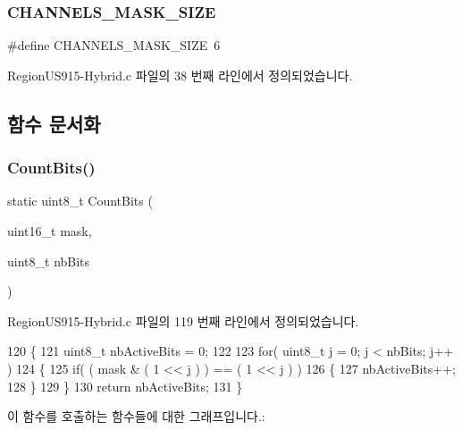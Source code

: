 \subsubsection{\texorpdfstring{C\+H\+A\+N\+N\+E\+L\+S\+\_\+\+M\+A\+S\+K\+\_\+\+S\+I\+ZE}{CHANNELS\_MASK\_SIZE}}
{\footnotesize\ttfamily \#define C\+H\+A\+N\+N\+E\+L\+S\+\_\+\+M\+A\+S\+K\+\_\+\+S\+I\+ZE~6}



Region\+U\+S915-\/\+Hybrid.\+c 파일의 38 번째 라인에서 정의되었습니다.



\subsection{함수 문서화}
\mbox{\label{_region_u_s915-_hybrid_8c_a8628e96fecf706f9925739e9c91535e7}} 
\subsubsection{\texorpdfstring{Count\+Bits()}{CountBits()}}
{\footnotesize\ttfamily static uint8\+\_\+t Count\+Bits (\begin{DoxyParamCaption}\item[{uint16\+\_\+t}]{mask,  }\item[{uint8\+\_\+t}]{nb\+Bits }\end{DoxyParamCaption})\hspace{0.3cm}{\ttfamily [static]}}



Region\+U\+S915-\/\+Hybrid.\+c 파일의 119 번째 라인에서 정의되었습니다.


\begin{DoxyCode}
120 \{
121     uint8\_t nbActiveBits = 0;
122 
123     \textcolor{keywordflow}{for}( uint8\_t j = 0; j < nbBits; j++ )
124     \{
125         \textcolor{keywordflow}{if}( ( mask & ( 1 << j ) ) == ( 1 << j ) )
126         \{
127             nbActiveBits++;
128         \}
129     \}
130     \textcolor{keywordflow}{return} nbActiveBits;
131 \}
\end{DoxyCode}
이 함수를 호출하는 함수들에 대한 그래프입니다.\+:
\mbox{\label{_region_u_s915-_hybrid_8c_a43fc7f3f4d15301eebe5c4a8b64b3f51}} 
